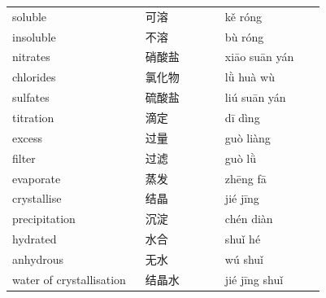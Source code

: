 \documentclass[11pt]{article}
\begin{document}
\begin{longtable}{@{}p{0.40\linewidth}p{0.24\linewidth}p{0.30\linewidth}@{}}
soluble & 可溶 & kě róng \\
insoluble & 不溶 & bù róng \\
nitrates & 硝酸盐 & xiāo suān yán \\
chlorides & 氯化物 & lǜ huà wù \\
sulfates & 硫酸盐 & liú suān yán \\
titration & 滴定 & dī dìng \\
excess & 过量 & guò liàng \\
filter & 过滤 & guò lǜ \\
evaporate & 蒸发 & zhēng fā \\
crystallise & 结晶 & jié jīng \\
precipitation & 沉淀 & chén diàn \\
hydrated & 水合 & shuǐ hé \\
anhydrous & 无水 & wú shuǐ \\
water of crystallisation & 结晶水 & jié jīng shuǐ \\
\end{longtable}
\end{document}
